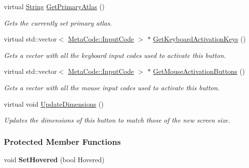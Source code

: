 \begin{DoxyCompactItemize}
virtual \hyperlink{namespacephys_aa03900411993de7fbfec4789bc1d392e}{String} \hyperlink{classphys_1_1UI_1_1Button_a8aad3cb0e33a2bfc4fc4913bf19396a5}{GetPrimaryAtlas} ()
\begin{DoxyCompactList}\small\item\em Gets the currently set primary atlas. \item\end{DoxyCompactList}\item 
virtual std::vector$<$ \hyperlink{classphys_1_1MetaCode_a3e501cbb5bf0f6f1fdb7211465bda8d8}{MetaCode::InputCode} $>$ $\ast$ \hyperlink{classphys_1_1UI_1_1Button_adb1a79145196e9682261f18fa8de04fe}{GetKeyboardActivationKeys} ()
\begin{DoxyCompactList}\small\item\em Gets a vector with all the keyboard input codes used to activate this button. \item\end{DoxyCompactList}\item 
virtual std::vector$<$ \hyperlink{classphys_1_1MetaCode_a3e501cbb5bf0f6f1fdb7211465bda8d8}{MetaCode::InputCode} $>$ $\ast$ \hyperlink{classphys_1_1UI_1_1Button_a2256e2f15cf3aea5abd3279178dc3199}{GetMouseActivationButtons} ()
\begin{DoxyCompactList}\small\item\em Gets a vector with all the mouse input codes used to activate this button. \item\end{DoxyCompactList}\item 
virtual void \hyperlink{classphys_1_1UI_1_1Button_ae69604605a9b4de08dbaf6738a241bb6}{UpdateDimensions} ()
\begin{DoxyCompactList}\small\item\em Updates the dimensions of this button to match those of the new screen size. \item\end{DoxyCompactList}\end{DoxyCompactItemize}
\subsubsection*{Protected Member Functions}
\begin{DoxyCompactItemize}
\item 
\hypertarget{classphys_1_1UI_1_1Button_a83bf58f1a849d878265cd0cb8193ddf7}{
void {\bfseries SetHovered} (bool Hovered)}
\label{d8/d88/classphys_1_1UI_1_1Button_a83bf58f1a849d878265cd0cb8193ddf7}

\end{DoxyCompactItemize}
